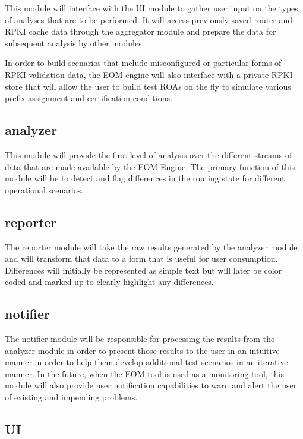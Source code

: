 This module will interface with the UI module to gather user input on
the types of analyses that are to be performed. It will access previously
saved router and RPKI cache data through the aggregator module and
prepare the data for subsequent analysis by other modules.

In order to build scenarios that include misconfigured or particular
forms of RPKI validation data, the EOM engine will also interface
with a private RPKI store that will allow the user to build test ROAs on
the fly to simulate various prefix assignment and certification
conditions.

\subsection{analyzer}

This module will provide the first level of analysis over the different
streams of data that are made available by the EOM-Engine.
The primary function of this module will be to detect and flag
differences in the routing state for different operational scenarios.

\subsection{reporter}

The reporter module will take the raw results generated by the
analyzer module and will transform that data to a form that
is useful for user consumption. Differences will initially be represented as
simple text but will later be color coded and marked up to clearly
highlight any differences. 

\subsection{notifier}

The notifier module will be responsible for processing the results from 
the analyzer module in order to present those results to the user in an
intuitive manner in order to help them develop additional test scenarios
in an iterative manner. In the future, when the EOM tool is used as a
monitoring tool, this module will also provide user notification
capabilities to warn and alert the user of existing and impending
problems.

\subsection{UI}

